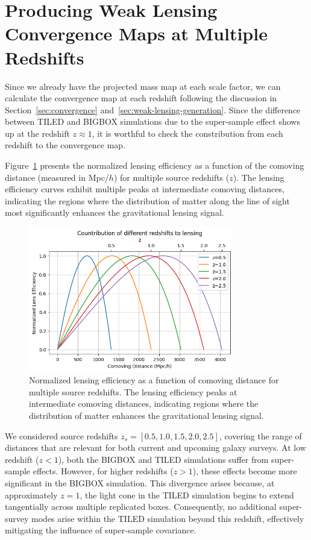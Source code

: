 \section{Producing Weak Lensing Convergence Maps at Multiple Redshifts}
Since we already have the projected mass map at each scale factor, we can calculate the convergence map at each redshift following the discussion in Section~\ref{sec:convergence} and~\ref{sec:weak-lensing-generation}. Since the difference between TILED and BIGBOX simulations due to the super-sample effect shows up at the redshift $z \approx 1$, it is worthful to check the constribution from each redshift to the convergence map.

Figure~\ref{fig:lensing_efficiency} presents the normalized lensing efficiency as a function of the comoving distance (measured in Mpc/$h$) for multiple source redshifts ($z$). The lensing efficiency curves exhibit multiple peaks at intermediate comoving distances, indicating the regions where the distribution of matter along the line of sight most significantly enhances the gravitational lensing signal. 

\begin{figure}
    \centering
    \includegraphics[width=0.8\textwidth]{figures/lensefficiency.png}
    \caption[Normalized lensing efficiency for multiple source redshifts]{Normalized lensing efficiency as a function of comoving distance for multiple source redshifts. The lensing efficiency peaks at intermediate comoving distances, indicating regions where the distribution of matter enhances the gravitational lensing signal.} \label{fig:lensing_efficiency}
\end{figure}

We considered source redshifts $z_s = [0.5, 1.0, 1.5, 2.0, 2.5]$, covering the range of distances that are relevant for both current and upcoming galaxy surveys. At low redshift ($z < 1$), both the BIGBOX and TILED simulations suffer from super-sample effects. However, for higher redshifts ($z > 1$), these effects become more significant in the BIGBOX simulation. This divergence arises because, at approximately $z = 1$, the light cone in the TILED simulation begins to extend tangentially across multiple replicated boxes. Consequently, no additional super-survey modes arise within the TILED simulation beyond this redshift, effectively mitigating the influence of super-sample covariance. 

